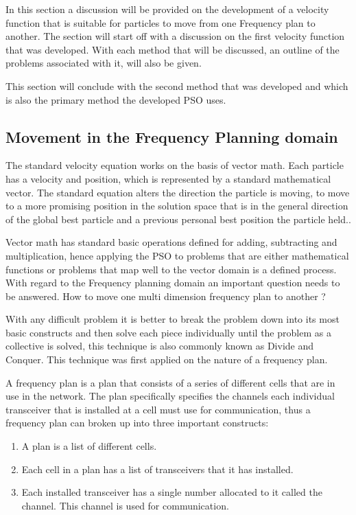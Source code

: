 In this section a discussion will be provided on the development of a velocity function that is suitable for particles to move from one Frequency plan to another. The section will start off with a discussion on the first velocity function that was developed. With each method that will be discussed, an outline of the problems associated with it, will also be given. 

This section will conclude with the second method that was developed and which is also the primary method the developed PSO uses.

\subsection{Movement in the Frequency Planning domain}
The standard velocity equation works on the basis of vector math. Each particle has a velocity and position, which is represented by a standard mathematical vector. The standard equation alters the direction the particle is moving, to move to a more promising position in the solution space that is in the general direction of the global best particle and a previous personal best position the particle held..

Vector math has standard basic operations defined for adding, subtracting and multiplication, hence applying the PSO to problems that are either mathematical functions or problems that map well to the vector domain is a defined process. With regard to the Frequency planning domain an important question needs to be answered. How to move one multi dimension frequency plan to another ?

With any difficult problem it is better to break the problem down into its most basic constructs and then solve each piece individually until the problem as a collective is solved, this technique is also commonly known as Divide and Conquer. This technique was first applied on the nature of a frequency plan.

A frequency plan is a plan that consists of a series of different cells that are in use in the network. The plan specifically specifies the channels each individual transceiver that is installed at a cell must use for communication, thus a frequency plan can broken up into three important constructs:
\begin{enumerate}
\item A plan is a list of different cells.
\item Each cell in a plan has a list of transceivers that it has installed.
\item Each installed transceiver has a single number allocated to it called the channel. This channel is used for communication.
\end{enumerate}

